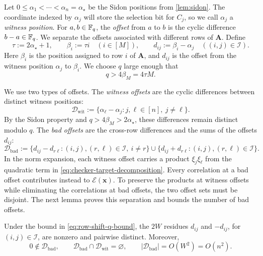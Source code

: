 Let
$0\le\alpha_1<\cdots<\alpha_n=\alpha_\star$ be the Sidon positions from
\cref{lem:sidon}.  The coordinate indexed by $\alpha_j$ will store the
selection bit for $C_j$, so we call $\alpha_j$ a \emph{witness position}.  For
$a,b\in\mathbb F_q$, the \emph{offset} from $a$ to $b$ is the cyclic difference
$b-a\in\mathbb F_q$.  We separate the offsets associated with different rows of
$\mathbf A$.  Define
\begin{equation}
\label{eq:row-shifts}
 \tau:=2\alpha_\star+1,
 \qquad
 \beta_i:=\tau i\quad(i\in[M]),
 \qquad
 d_{ij}:=\beta_i-\alpha_j\quad((i,j)\in\mathcal I).
\end{equation}
Here $\beta_i$ is the position assigned to row $i$ of $\mathbf A$,
and $d_{ij}$ is the offset from the witness position $\alpha_j$ to
$\beta_i$.  We choose $q$
large enough that
\begin{equation}
\label{eq:row-shift-q-bound}
 q>4\beta_M=4\tau M.
\end{equation}

We use two types of offsets.  The \emph{witness offsets} are the
cyclic differences between distinct witness positions:
\[
\mathcal D_{\mathrm{wit}}
 :=\{\alpha_\ell-\alpha_j:j,\ell\in[n],\ j\ne\ell\}.
\]
By the Sidon property and
$q>4\beta_M>2\alpha_\star$, these differences remain distinct modulo $q$.
The \emph{bad offsets} are the cross-row differences and the sums
of the offsets $d_{ij}$:
\[
 \mathcal D_{\mathrm{bad}}
 :=\{d_{ij}-d_{r\ell}:(i,j),(r,\ell)\in\mathcal I,\ i\ne r\}
 \cup
 \{d_{ij}+d_{r\ell}:(i,j),(r,\ell)\in\mathcal I\}.
\]
In the norm expansion, each witness offset carries a product
$\xi_j\xi_\ell$ from the quadratic term in
\cref{eq:checker-target-decomposition}.  Every correlation at a bad
 offset contributes instead to $\mathcal E(\mathbf x)$.  To preserve the products
at witness offsets while eliminating the correlations at bad offsets, the two
offset sets must be disjoint.  The next lemma proves this separation and bounds the number of
bad offsets.
\begin{lemma}
\label{lem:row-shift-separation}
Under the bound in \cref{eq:row-shift-q-bound}, the $2W$
residues $d_{ij}$ and $-d_{ij}$, for $(i,j)\in\mathcal I$, are nonzero and pairwise
distinct.
Moreover,
\[
 0\notin\mathcal D_{\mathrm{bad}},
 \qquad
 \mathcal D_{\mathrm{bad}}\cap\mathcal D_{\mathrm{wit}}=\varnothing,
 \qquad
 |\mathcal D_{\mathrm{bad}}|=O(W^2)=O(n^2).
\]
\end{lemma}

